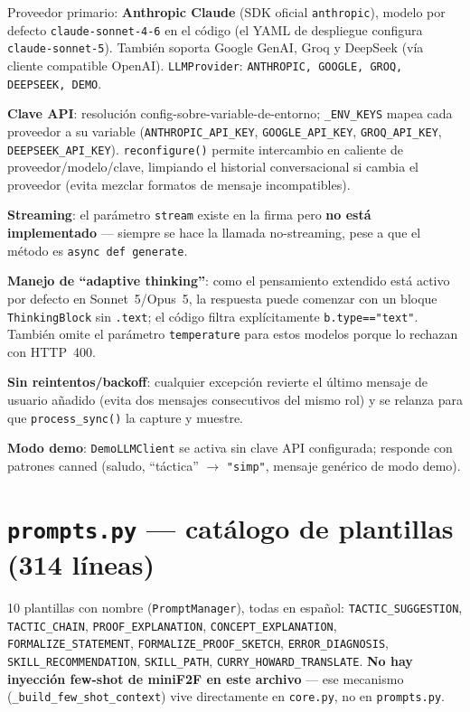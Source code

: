 \documentclass[11pt,a4paper]{report}
\newcommand{\code}[1]{\texttt{#1}}
\begin{document}
Proveedor primario: \textbf{Anthropic Claude} (SDK oficial \code{anthropic}), modelo por defecto \code{claude-sonnet-4-6} en el c\'odigo (el YAML de despliegue configura \code{claude-sonnet-5}). Tambi\'en soporta Google GenAI, Groq y DeepSeek (v\'ia cliente compatible OpenAI). \code{LLMProvider}: \code{ANTHROPIC, GOOGLE, GROQ, DEEPSEEK, DEMO}.

\textbf{Clave API}: resoluci\'on config-sobre-variable-de-entorno; \code{\_ENV_KEYS} mapea cada proveedor a su variable (\code{ANTHROPIC_API_KEY}, \code{GOOGLE_API_KEY}, \code{GROQ_API_KEY}, \code{DEEPSEEK_API_KEY}). \code{reconfigure()} permite intercambio en caliente de proveedor/modelo/clave, limpiando el historial conversacional si cambia el proveedor (evita mezclar formatos de mensaje incompatibles).

\textbf{Streaming}: el par\'ametro \code{stream} existe en la firma pero \textbf{no est\'a implementado} --- siempre se hace la llamada no-streaming, pese a que el m\'etodo es \code{async def generate}.

\textbf{Manejo de ``adaptive thinking''}: como el pensamiento extendido est\'a activo por defecto en Sonnet~5/Opus~5, la respuesta puede comenzar con un bloque \code{ThinkingBlock} sin \code{.text}; el c\'odigo filtra expl\'icitamente \code{b.type=="text"}. Tambi\'en omite el par\'ametro \code{temperature} para estos modelos porque lo rechazan con HTTP~400.

\textbf{Sin reintentos/backoff}: cualquier excepci\'on revierte el \'ultimo mensaje de usuario a\~nadido (evita dos mensajes consecutivos del mismo rol) y se relanza para que \code{process_sync()} la capture y muestre.

\textbf{Modo demo}: \code{DemoLLMClient} se activa sin clave API configurada; responde con patrones canned (saludo, ``t\'actica'' $\to$ \code{"simp"}, mensaje gen\'erico de modo demo).

\section{\code{prompts.py} --- cat\'alogo de plantillas (314 l\'ineas)}

10 plantillas con nombre (\code{PromptManager}), todas en espa\~nol: \code{TACTIC\_SUGGESTION}, \code{TACTIC\_CHAIN}, \code{PROOF\_EXPLANATION}, \code{CONCEPT\_EXPLANATION}, \code{FORMALIZE\_STATEMENT}, \code{FORMALIZE\_PROOF\_SKETCH}, \code{ERROR\_DIAGNOSIS}, \code{SKILL\_RECOMMENDATION}, \code{SKILL\_PATH}, \code{CURRY\_HOWARD\_TRANSLATE}. \textbf{No hay inyecci\'on few-shot de miniF2F en este archivo} --- ese mecanismo (\code{\_build\_few\_shot\_context}) vive directamente en \code{core.py}, no en \code{prompts.py}.
\end{document}
